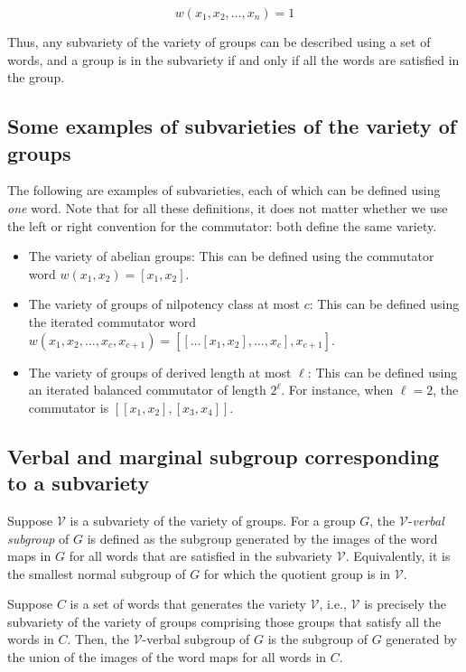 \documentclass{ucetd}
\begin{document}
$$w(x_1,x_2,\dots,x_n) = 1$$

Thus, any subvariety of the variety of groups can be described using a
set of words, and a group is in the subvariety if and only if all the
words are satisfied in the group.

\subsection{Some examples of subvarieties of the variety of groups}

The following are examples of subvarieties, each of which can be
defined using {\em one} word. Note that for all these definitions, it
does not matter whether we use the left or right convention for the
commutator: both define the same variety.

\begin{itemize}
\item The variety of abelian groups: This can be defined using the
  commutator word $w(x_1,x_2) = [x_1,x_2]$. 
\item The variety of groups of nilpotency class at most $c$: This can
  be defined using the iterated commutator word
  $w(x_1,x_2,\dots,x_c,x_{c+1}) = [[ \dots
      [x_1,x_2],\dots,x_c],x_{c+1}]$. 
\item The variety of groups of derived length at most $\ell$: This can
  be defined using an iterated balanced commutator of length
  $2^\ell$. For instance, when $\ell = 2$, the commutator is
  $[[x_1,x_2],[x_3,x_4]]$.
\end{itemize}

\subsection{Verbal and marginal subgroup corresponding to a subvariety}

Suppose $\mathcal{V}$ is a subvariety of the variety of groups. For a
group $G$, the $\mathcal{V}$-{\em verbal subgroup} of $G$ is defined
as the subgroup generated by the images of the word maps in $G$ for
all words that are satisfied in the subvariety
$\mathcal{V}$. Equivalently, it is the smallest normal subgroup of $G$
for which the quotient group is in $\mathcal{V}$.

Suppose $C$ is a set of words that generates the variety
$\mathcal{V}$, i.e., $\mathcal{V}$ is precisely the subvariety of the
variety of groups comprising those groups that satisfy all the words
in $C$. Then, the $\mathcal{V}$-verbal subgroup of $G$ is the subgroup
of $G$ generated by the union of the images of the word maps for all
words in $C$.
\end{document}
